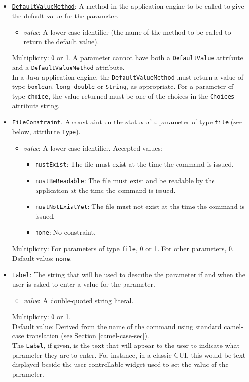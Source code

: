\documentclass[11pt]{article}
\begin{document}
\begin{itemize}
\item \underline{\tt DefaultValueMethod}:  A method in the application
engine to be called to give the default value for the parameter.
\begin{itemize}
\item {\it value}:  A lower-case identifier (the name of the method
  to be called to return the default value).
\end{itemize}
Multiplicity: 0 or 1.  A parameter cannot have both a {\tt DefaultValue}
attribute and a {\tt DefaultValueMethod} attribute. \\
In a Java application engine, the {\tt DefaultValueMethod} must return a
value of type {\tt boolean},
{\tt long}, {\tt double} or {\tt String}, as appropriate.
For a parameter of type {\tt choice}, the value returned must be one
of the choices in the {\tt Choices} attribute string.

\item \underline{\tt FileConstraint}:  A constraint on the status of
a parameter of type {\tt file} (see below, attribute {\tt Type}).
\begin{itemize}
\item {\it value}: A lower-case identifier.  Accepted values:
  \begin{itemize}
  \item {\tt mustExist}:  The file must exist at the time the
    command is issued.
  \item {\tt mustBeReadable}:  The file must exist and be
    readable by the application at the time the command is issued.
  \item {\tt mustNotExistYet}:  The file must not exist at the
    time the command is issued.
  \item {\tt none}:  No constraint.
  \end{itemize}
\end{itemize}
Multiplicity: For parameters of type {\tt file},  0 or 1.
For other parameters, 0. \\
Default value: {\tt none}.

\item \underline{\tt Label}:  The string that will be used to describe the
parameter if and when the user is asked to enter a value for the parameter.
\begin{itemize}
\item {\it value}:  A double-quoted string literal.
\end{itemize}
Multiplicity: 0 or 1. \\
Default value:  Derived from the name of the command using standard
camel-case translation (see Section \ref{camel-case-sec}). \\
The {\tt Label}, if given, is the text that will appear to the user to
indicate what parameter they are to enter.  For instance, in a classic
GUI, this would be text displayed beside the user-controllable widget used
to set the value of the parameter.


\end{itemize}
\end{document}
